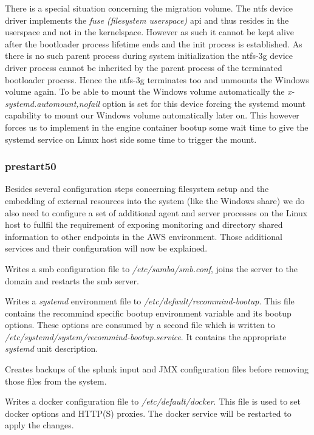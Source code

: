 \begin{description}
				There is a special situation concerning the migration volume. The ntfs device driver implements the \emph{fuse (filesystem userspace)} api and thus resides in the userspace and not in the kernelspace. However as such it cannot be kept alive after the bootloader process lifetime ends and the init process is established. As there is no such parent process during system initialization the ntfs-3g device driver process cannot be inherited by the parent process of the terminated bootloader process. Hence the ntfs-3g terminates too and unmounts the Windows volume again. To be able to mount the Windows volume automatically the \emph{x-systemd.automount,nofail} option is set for this device forcing the systemd mount capability to mount our Windows volume automatically later on. This however forces us to implement in the engine container bootup some wait time to give the systemd service on Linux host side some time to trigger the mount.
			\end{description}
			
			\subsubsection{prestart50}
			Besides several configuration steps concerning filesystem setup and the embedding of external resources into the system (like the Windows share) we do also need to configure a set of additional agent and server processes on the Linux host to fullfil the requirement of exposing monitoring and directory shared information to other endpoints in the AWS environment. Those additional services and their configuration will now be explained.
			\begin{description}\sloppy
				\item[smb server configuration] Writes a smb configuration file to \emph{/etc/samba/smb.conf}, joins the server to the domain and restarts the smb server.
				\item[systemd unit description installation] Writes a \emph{systemd} environment file to \emph{/etc/default/recommind-bootup}. This file contains the recommind specific bootup environment variable and its bootup options. These options are consumed by a second file which is written to \emph{/etc/systemd/system/recommind-bootup.service}. It contains the appropriate \emph{systemd} unit description.
				\item[splunk config removal] Creates backups of the splunk input and JMX configuration files before removing those files from the system.
				\item[docker configuration update] Writes a docker configuration file to \emph{/etc/default/docker}. This file is used to set docker options and HTTP(S) proxies. The docker service will be restarted to apply the changes.
			\end{description}
			

